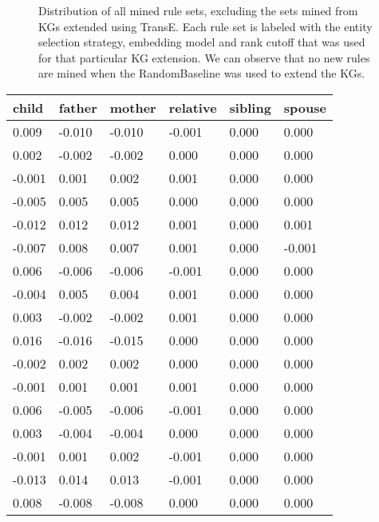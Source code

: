 \begin{figure}[htbp]
\centering
    \centering
    
    \caption[Dist. of all sets of mined rules, excluding TransE.]{Distribution of all mined rule sets, excluding the sets mined from KGs extended using TransE. Each rule set is labeled with the entity selection strategy, embedding model and rank cutoff that was used for that particular KG extension. We can observe that no new rules are mined when the RandomBaseline was used to extend the KGs.}
    \label{all_sets_w_out_TransE}
\end{figure}


\begin{longtable}{llllll}
\textbf{child} & \textbf{father} & \textbf{mother} & \textbf{relative} & \textbf{sibling} & \textbf{spouse} \\ \hline
0.009  & -0.010 & -0.010 & -0.001   & 0.000   & 0.000  \\
0.002  & -0.002 & -0.002 & 0.000    & 0.000   & 0.000  \\
-0.001 & 0.001  & 0.002  & 0.001    & 0.000   & 0.000  \\
-0.005 & 0.005  & 0.005  & 0.000    & 0.000   & 0.000  \\
-0.012 & 0.012  & 0.012  & 0.001    & 0.000   & 0.001  \\
-0.007 & 0.008  & 0.007  & 0.001    & 0.000   & -0.001 \\
0.006  & -0.006 & -0.006 & -0.001   & 0.000   & 0.000  \\
-0.004 & 0.005  & 0.004  & 0.001    & 0.000   & 0.000  \\
0.003  & -0.002 & -0.002 & 0.001    & 0.000   & 0.000  \\
0.016  & -0.016 & -0.015 & 0.000    & 0.000   & 0.000  \\
-0.002 & 0.002  & 0.002  & 0.000    & 0.000   & 0.000  \\
-0.001 & 0.001  & 0.001  & 0.001    & 0.000   & 0.000  \\
0.006  & -0.005 & -0.006 & -0.001   & 0.000   & 0.000  \\
0.003  & -0.004 & -0.004 & 0.000    & 0.000   & 0.000  \\
-0.001 & 0.001  & 0.002  & -0.001   & 0.000   & 0.000  \\
-0.013 & 0.014  & 0.013  & -0.001   & 0.000   & 0.000  \\
0.008  & -0.008 & -0.008 & 0.000    & 0.000   & 0.000  \\

\end{longtable}
